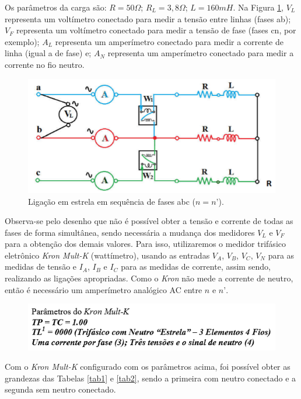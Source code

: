 \documentclass[a4paper,12pt,oneside,openany,table,xcdraw]{article}
\begin{document}
Os parâmetros da carga são: $R = 50\Omega$; $R_L = 3,8 \Omega$; $L = 160 mH$. Na Figura \ref{fig1}, $V_L$ representa um voltímetro conectado para medir a tensão entre linhas (fases ab); $V_F$ representa um voltímetro conectado para medir a tensão de fase (fases cn, por exemplo); $A_L$ representa um amperímetro conectado para medir a corrente de linha (igual a de fase) e; $A_N$ representa um amperímetro conectado para medir a corrente no fio neutro. 
\begin{figure}[H]
\centering
\captionsetup{font=scriptsize}
\includegraphics[width=14cm]{fig1}
\caption{Ligação em estrela em sequência de fases abc ($n = n’$).}
\label{fig1}
\end{figure}
Observa-se pelo desenho que não é possível obter a tensão e corrente de todas as fases de forma simultânea, sendo necessária a mudança dos medidores $V_L$ e $V_F$ para a obtenção dos demais valores. Para isso, utilizaremos o medidor trifásico eletrônico \textit{Kron Mult-K} (wattímetro),  usando as entradas $V_A$, $V_B$, $V_C$, $V_N$ para as medidas de tensão e $I_A$, $I_B$ e $I_C$ para as medidas de corrente, assim sendo, realizando as ligações apropriadas. Como o \textit{Kron} não mede a corrente de neutro, então é necessário um amperímetro analógico AC entre $n$ e $n’$.

\begin{figure}[H]
\centering
\captionsetup{font=scriptsize}
\includegraphics[width=13.5cm]{parametros1}
\end{figure}

Com o \textit{Kron Mult-K} configurado com os parâmetros acima, foi possível obter as grandezas das Tabelas \ref{tab1} e \ref{tab2}, sendo a primeira com neutro conectado e a segunda sem neutro conectado.
\end{document}
